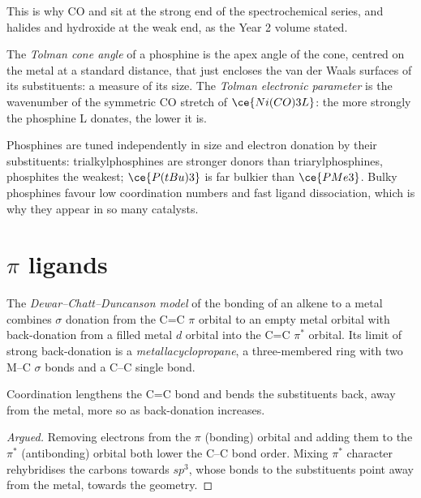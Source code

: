 This is why CO and  sit at the strong end of the spectrochemical series, and
halides and hydroxide at the weak end, as the Year 2 volume stated.

\begin{definition}\label{def:b3:organometallic-bonding:tolman}
The \emph{Tolman cone angle} of a phosphine is the apex
angle of the cone, centred on the metal at a standard distance, that just
encloses the van der Waals surfaces of its substituents: a measure of its size.
The \emph{Tolman electronic parameter} is the
wavenumber of the symmetric CO stretch of $\ce{Ni(CO)3L}$: the more strongly the
phosphine L donates, the lower it is.
\end{definition}

Phosphines are tuned independently in size and electron donation by their
substituents: trialkylphosphines are stronger donors than triarylphosphines,
phosphites the weakest; $\ce{P(tBu)3}$ is far bulkier than $\ce{PMe3}$. Bulky phosphines favour
low coordination numbers and fast ligand dissociation, which is why they
appear in so many catalysts.

\section{$\pi$ ligands}

\begin{definition}\label{def:b3:organometallic-bonding:dcd}
The \emph{Dewar--Chatt--Duncanson model} of
the bonding of an alkene to a metal combines $\sigma$ donation from the C=C $\pi$ orbital
to an empty metal orbital with back-donation from a filled metal $d$ orbital into
the C=C $\pi^*$ orbital. Its limit of strong back-donation is a
\emph{metallacyclopropane}, a three-membered ring
with two M--C $\sigma$ bonds and a C--C single bond.
\end{definition}

\begin{proposition}\label{prop:b3:organometallic-bonding:dcd}
Coordination lengthens the C=C bond and bends the substituents back, away from
the metal, more so as back-donation increases.
\end{proposition}

\begin{proof}[Argued]
Removing electrons from the $\pi$ (bonding) orbital and adding them to the $\pi^*$
(antibonding) orbital both lower the C--C bond order. Mixing $\pi^*$ character
rehybridises the carbons towards $sp^3$, whose bonds to the substituents point away
from the metal, towards the  geometry.
\end{proof}

